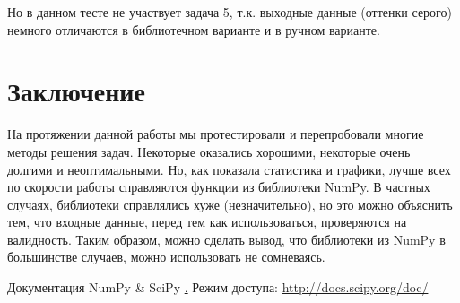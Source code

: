 \documentclass[12pt, a4paper]{article}
\begin{document}
			Но в данном тесте не участвует задача 5, т.к. выходные данные (оттенки серого) немного отличаются в библиотечном варианте и в ручном варианте.



	\newpage
	\section{Заключение}
		На протяжении данной работы мы протестировали и перепробовали многие методы решения задач. Некоторые оказались хорошими, некоторые очень долгими и неоптимальными. Но, как показала статистика и графики, лучше всех по скорости работы справляются функции из библиотеки NumPy. В частных случаях, библиотеки справлялись хуже (незначительно), но это можно объяснить тем, что входные данные, перед тем как использоваться, проверяются на валидность. Таким образом, можно сделать вывод, что библиотеки из NumPy в большинстве случаев, можно использовать не сомневаясь.



	\newpage
	\begin{thebibliography}{9}
			Документация NumPy \& SciPy \href{http://docs.scipy.org/doc/}. Режим доступа: \href{http://docs.scipy.org/doc/}{http://docs.scipy.org/doc/}
	\end{thebibliography}
\end{document}

